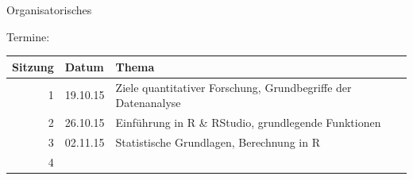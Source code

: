 \documentclass[ignorenonframetext,]{beamer}
\begin{document}
\begin{frame}{Organisatorisches}

Termine:

\begin{longtable}[c]{@{}rll@{}}
\toprule
\begin{minipage}[b]{0.18\columnwidth}\raggedleft\strut
Sitzung
\strut\end{minipage} &
\begin{minipage}[b]{0.18\columnwidth}\raggedright\strut
Datum
\strut\end{minipage} &
\begin{minipage}[b]{0.46\columnwidth}\raggedright\strut
Thema
\strut\end{minipage}\tabularnewline
\midrule
\endhead
\begin{minipage}[t]{0.18\columnwidth}\raggedleft\strut
1
\strut\end{minipage} &
\begin{minipage}[t]{0.18\columnwidth}\raggedright\strut
19.10.15
\strut\end{minipage} &
\begin{minipage}[t]{0.46\columnwidth}\raggedright\strut
Ziele quantitativer Forschung, Grundbegriffe der Datenanalyse
\strut\end{minipage}\tabularnewline
\begin{minipage}[t]{0.18\columnwidth}\raggedleft\strut
2
\strut\end{minipage} &
\begin{minipage}[t]{0.18\columnwidth}\raggedright\strut
26.10.15
\strut\end{minipage} &
\begin{minipage}[t]{0.46\columnwidth}\raggedright\strut
Einführung in R \& RStudio, grundlegende Funktionen
\strut\end{minipage}\tabularnewline
\begin{minipage}[t]{0.18\columnwidth}\raggedleft\strut
3
\strut\end{minipage} &
\begin{minipage}[t]{0.18\columnwidth}\raggedright\strut
02.11.15
\strut\end{minipage} &
\begin{minipage}[t]{0.46\columnwidth}\raggedright\strut
Statistische Grundlagen, Berechnung in R
\strut\end{minipage}\tabularnewline
\begin{minipage}[t]{0.18\columnwidth}\raggedleft\strut
4
\strut\end{minipage} &
\begin{minipage}[t]{0.18\columnwidth}\raggedright\strut

\end{minipage}
\end{longtable}
\end{frame}
\end{document}
